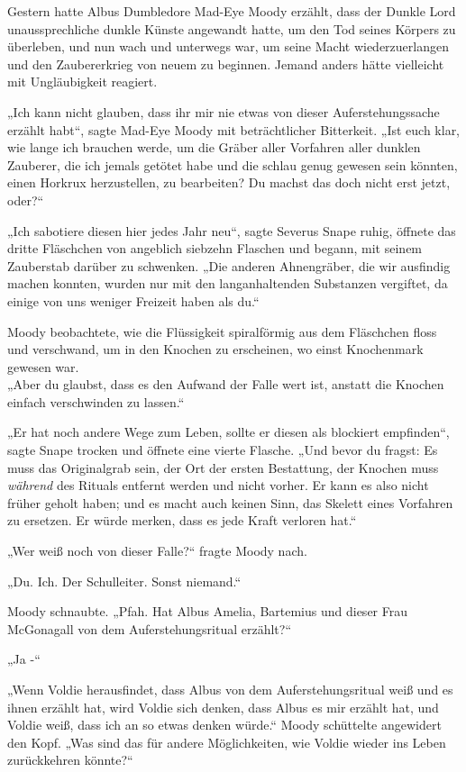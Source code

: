 {Gestern hatte Albus Dumbledore Mad-Eye Moody erzählt, dass der Dunkle Lord unaussprechliche dunkle Künste angewandt hatte, um den Tod seines Körpers zu überleben, und nun wach und unterwegs war, um seine Macht wiederzuerlangen und den Zaubererkrieg von neuem zu beginnen. Jemand anders hätte vielleicht mit Ungläubigkeit reagiert.

„Ich kann nicht glauben, dass ihr mir nie etwas von dieser Auferstehungssache erzählt habt“, sagte Mad-Eye Moody mit beträchtlicher Bitterkeit. „Ist euch klar, wie lange ich brauchen werde, um die Gräber aller Vorfahren aller dunklen Zauberer, die ich jemals getötet habe und die schlau genug gewesen sein könnten, einen Horkrux herzustellen, zu bearbeiten? Du machst das doch nicht erst jetzt, oder?“

„Ich sabotiere diesen hier jedes Jahr neu“, sagte Severus Snape ruhig, öffnete das dritte Fläschchen von angeblich siebzehn Flaschen und begann, mit seinem Zauberstab darüber zu schwenken. „Die anderen Ahnengräber, die wir ausfindig machen konnten, wurden nur mit den langanhaltenden Substanzen vergiftet, da einige von uns weniger Freizeit haben als du.“

Moody beobachtete, wie die Flüssigkeit spiralförmig aus dem Fläschchen floss und verschwand, um in den Knochen zu erscheinen, wo einst Knochenmark gewesen war.\\ „Aber du glaubst, dass es den Aufwand der Falle wert ist, anstatt die Knochen einfach verschwinden zu lassen.“

„Er hat noch andere Wege zum Leben, sollte er diesen als blockiert empfinden“, sagte Snape trocken und öffnete eine vierte Flasche. „Und bevor du fragst: Es muss das Originalgrab sein, der Ort der ersten Bestattung, der Knochen muss \emph{während} des Rituals entfernt werden und nicht vorher. Er kann es also nicht früher geholt haben; und es macht auch keinen Sinn, das Skelett eines Vorfahren zu ersetzen. Er würde merken, dass es jede Kraft verloren hat.“

„Wer weiß noch von dieser Falle?“ fragte Moody nach.

„Du. Ich. Der Schulleiter. Sonst niemand.“

Moody schnaubte. „Pfah. Hat Albus Amelia, Bartemius und dieser Frau McGonagall von dem Auferstehungsritual erzählt?“

„Ja -“

„Wenn Voldie herausfindet, dass Albus von dem Auferstehungsritual weiß und es ihnen erzählt hat, wird Voldie sich denken, dass Albus es mir erzählt hat, und Voldie weiß, dass ich an so etwas denken würde.“ Moody schüttelte angewidert den Kopf. „Was sind das für andere Möglichkeiten, wie Voldie wieder ins Leben zurückkehren könnte?“

}

